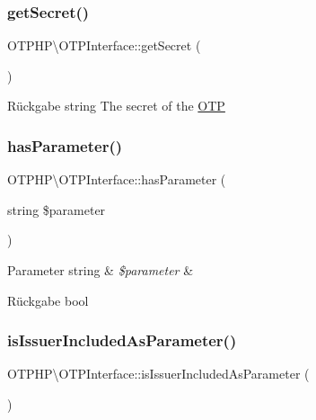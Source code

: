 \subsubsection{\texorpdfstring{get\+Secret()}{getSecret()}}
{\footnotesize\ttfamily O\+T\+P\+H\+P\textbackslash{}\+O\+T\+P\+Interface\+::get\+Secret (\begin{DoxyParamCaption}{ }\end{DoxyParamCaption})}

\begin{DoxyReturn}{Rückgabe}
string The secret of the \mbox{\hyperlink{class_o_t_p_h_p_1_1_o_t_p}{O\+TP}} 
\end{DoxyReturn}
\mbox{\label{interface_o_t_p_h_p_1_1_o_t_p_interface_aec06de027a5328d9d8116ff74540080d}} 
\subsubsection{\texorpdfstring{has\+Parameter()}{hasParameter()}}
{\footnotesize\ttfamily O\+T\+P\+H\+P\textbackslash{}\+O\+T\+P\+Interface\+::has\+Parameter (\begin{DoxyParamCaption}\item[{string}]{\$parameter }\end{DoxyParamCaption})}


\begin{DoxyParams}[1]{Parameter}
string & {\em \$parameter} & \\
\hline
\end{DoxyParams}
\begin{DoxyReturn}{Rückgabe}
bool 
\end{DoxyReturn}
\mbox{\label{interface_o_t_p_h_p_1_1_o_t_p_interface_aea4b15b8f9dc0adc7924090e0908afb6}} 
\subsubsection{\texorpdfstring{is\+Issuer\+Included\+As\+Parameter()}{isIssuerIncludedAsParameter()}}
{\footnotesize\ttfamily O\+T\+P\+H\+P\textbackslash{}\+O\+T\+P\+Interface\+::is\+Issuer\+Included\+As\+Parameter (\begin{DoxyParamCaption}{ }\end{DoxyParamCaption})}

